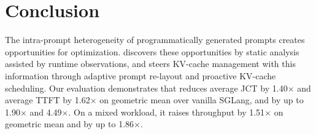 \section{Conclusion}
\label{sec:conclusion}
The intra-prompt heterogeneity of programmatically generated prompts creates opportunities for optimization. \sysname discovers these opportunities by static analysis assisted by runtime observations, and steers KV-cache management with this information through adaptive prompt re-layout and proactive KV-cache scheduling. Our evaluation demonstrates that \sysname reduces average JCT by 1.40$\times$ and average TTFT by 1.62$\times$ on geometric mean over vanilla SGLang, and by up to 1.90$\times$ and 4.49$\times$. On a mixed workload, it raises throughput by 1.51$\times$ on geometric mean and by up to 1.86$\times$. 